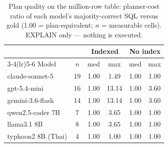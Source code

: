 \begin{table}[t]
\caption{Plan quality on the million-row table: planner-cost ratio of
each model's majority-correct SQL versus gold (1.00 = plan-equivalent;
$n$ = measurable cells). EXPLAIN only --- nothing is executed.}
\label{tab:plan}
\centering\small
\begin{tabular}{lccccc}
\toprule
 & & \multicolumn{2}{c}{Indexed} & \multicolumn{2}{c}{No index} \\
\cmidrule(lr){3-4}\cmidrule(lr){5-6}
Model & $n$ & med & max & med & max \\
\midrule
claude-sonnet-5 & 19 & 1.00 & 1.49 & 1.00 & 1.00 \\
gpt-5.4-mini & 16 & 1.00 & 13.14 & 1.00 & 3.60 \\
gemini-3.6-flash & 14 & 1.00 & 13.14 & 1.00 & 3.60 \\
qwen2.5-coder 7B & 7 & 1.00 & 3.65 & 1.00 & 1.00 \\
llama3.1 8B & 8 & 1.00 & 3.65 & 1.00 & 1.00 \\
typhoon2 8B (Thai) & 4 & 1.00 & 1.00 & 1.00 & 1.00 \\
\bottomrule
\end{tabular}
\end{table}
